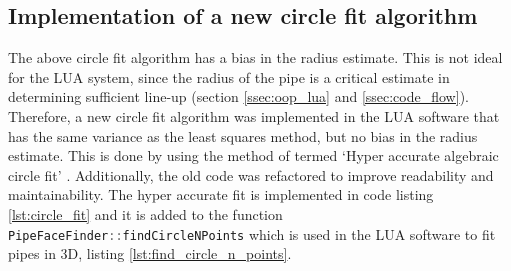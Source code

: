 \subsection{Implementation of a new circle fit algorithm}
The above circle fit algorithm has a bias in the radius estimate. This is not ideal for the LUA system, since the radius of the pipe is a critical estimate in determining sufficient line-up (section \ref{ssec:oop_lua} and \ref{ssec:code_flow}). Therefore, a new circle fit algorithm was implemented in the LUA software that has the same variance as the least squares method, but no bias in the radius estimate. This is done by using the method of \citeauthor{alsharadqah_chernov_circle_fitting} termed `Hyper accurate algebraic circle fit' \cite{alsharadqah_chernov_circle_fitting}. Additionally, the old code was refactored to improve readability and maintainability. The hyper accurate fit is implemented in code listing \ref{lst:circle_fit} and it is added to the function \lstinline[language=C]|PipeFaceFinder::findCircleNPoints| which is used in the LUA software to fit pipes in 3D, listing \ref{lst:find_circle_n_points}.